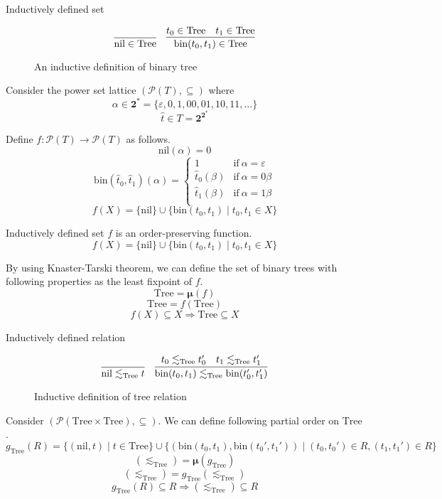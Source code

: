 \documentclass[9pt]{beamer}
\newcommand\pow[1]{\mathcal{P}(#1)}
\newcommand\two[0]{\mathbf{2}}
\newcommand\Tree[0]{\text{Tree}}
\newcommand\nil[0]{\text{nil}}
\newcommand\bin[0]{\text{bin}}
\newcommand\fix[0]{\boldsymbol{\mu}}
\begin{document}
\begin{frame}{Inductively defined set}
  \begin{figure}
  \[
    \infer
    {\nil \in \Tree}
    { }
    \quad
    \infer
    {\bin(t_0,t_1) \in \Tree}
    {t_0 \in \Tree & t_1 \in \Tree}
  \]
  \caption{An inductive definition of binary tree}
  \end{figure}

  \pause
  Consider the power set lattice $(\pow{T}, \subseteq)$ where
  $$\alpha \in \two^* = \{\varepsilon, 0, 1, 00, 01, 10, 11, ...\}$$
  $$\hat t \in T = \two^{\two^*}$$

  Define $f : \pow{T} \to \pow{T}$ as follows.
  $$ \nil(\alpha) = 0 $$
  $$\bin(\hat t_0, \hat t_1)(\alpha) = \begin{cases}
    1               & \text{if} \ \alpha = \varepsilon \\
    \hat t_0(\beta) & \text{if} \ \alpha = 0\beta \\
    \hat t_1(\beta) & \text{if} \ \alpha = 1\beta \\
    \end{cases}
  $$
  $$ f(X) = \{\nil\} \cup \{\bin(t_0,t_1) \mid t_0, t_1 \in X\} $$
\end{frame}

\begin{frame}{Inductively defined set}
  $f$ is an order-preserving function.
  $$ f(X) = \{\nil\} \cup \{\bin(t_0,t_1) \mid t_0, t_1 \in X\} $$

  By using Knaster-Tarski theorem, we can define the set of binary trees with following properties
  as the least fixpoint of $f$.
  $$ \Tree = \fix(f) $$
  $$ \Tree = f(\Tree) $$
  $$ f(X) \subseteq X \Rightarrow \Tree \subseteq X $$
\end{frame}

\begin{frame}{Inductively defined relation}
  \begin{figure}
  \[
    \infer
    {\nil \lesssim_{\Tree} t}
    {}
    \quad
    \infer
    {\bin(t_0,t_1) \lesssim_{\Tree} \bin(t_0',t_1')}
    {t_0 \lesssim_{\Tree} t_0' & t_1 \lesssim_{\Tree} t_1'}
  \]
  \caption{Inductive definition of tree relation}
  \end{figure}

  Consider $(\pow{\Tree \times \Tree}, \subseteq)$.
  We can define following partial order on $\Tree$.
  $$ g_{\Tree}(R) =
    \{(\nil,t) \mid t \in \Tree\} \cup
    \{(\bin(t_0, t_1), \bin(t_0', t_1')) \mid (t_0, t_0') \in R, (t_1, t_1') \in R \}
  $$
  $$ (\lesssim_{\Tree}) = \fix(g_{\Tree}) $$
  $$ (\lesssim_{\Tree}) = g_{\Tree}(\lesssim_{\Tree}) $$
  $$ g_{\Tree}(R) \subseteq R \Rightarrow (\lesssim_{\Tree}) \subseteq R $$
\end{frame}
\end{document}
